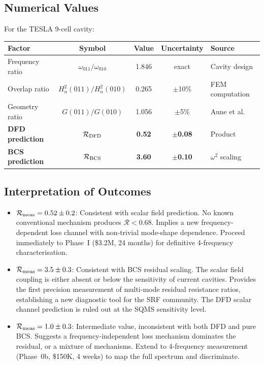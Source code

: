 \documentclass[11pt]{article}
\newcommand{\Rq}{\mathcal{R}}
\newcommand{\Heff}{H_n}
\begin{document}
\subsection{Numerical Values}

For the TESLA 9-cell cavity:

\begin{center}
\renewcommand{\arraystretch}{1.3}
\begin{tabular}{@{}lcccl@{}}
\toprule
\textbf{Factor} & \textbf{Symbol} & \textbf{Value} & \textbf{Uncertainty}
& \textbf{Source} \\
\midrule
Frequency ratio & $\omega_{011}/\omega_{010}$ & 1.846 & exact & Cavity
design \\
Overlap ratio & $\Heff^2(011)/\Heff^2(010)$ & 0.265 & $\pm$10\% & FEM
computation \\
Geometry ratio & $G(011)/G(010)$ & 1.056 & $\pm$5\% & Aune et al. \\
\midrule
\textbf{DFD prediction} & $\Rq_{\rm DFD}$ & \textbf{0.52} &
$\pm$\textbf{0.08} & Product \\
\textbf{BCS prediction} & $\Rq_{\rm BCS}$ & \textbf{3.60} &
$\pm$\textbf{0.10} & $\omega^2$ scaling \\
\bottomrule
\end{tabular}
\end{center}

\subsection{Interpretation of Outcomes}

\begin{itemize}
\item \textbf{$\Rq_{\rm meas} = 0.52 \pm 0.2$}: Consistent with scalar
  field prediction. No known conventional mechanism produces $\Rq < 0.68$.
  Implies a new frequency-dependent loss channel with non-trivial mode-shape
  dependence. Proceed immediately to Phase~I (\$3.2M, 24 months) for
  definitive 4-frequency characterisation.

\item \textbf{$\Rq_{\rm meas} = 3.5 \pm 0.3$}: Consistent with BCS
  residual scaling. The scalar field coupling is either absent or below
  the sensitivity of current cavities. Provides the first precision
  measurement of multi-mode residual resistance ratios, establishing
  a new diagnostic tool for the SRF community. The DFD scalar channel
  prediction is ruled out at the SQMS sensitivity level.

\item \textbf{$\Rq_{\rm meas} = 1.0 \pm 0.3$}: Intermediate value,
  inconsistent with both DFD and pure BCS. Suggests a
  frequency-independent loss mechanism dominates the residual, or a
  mixture of mechanisms. Extend to 4-frequency measurement (Phase~0b,
  \$150K, 4 weeks) to map the full spectrum and discriminate.
\end{itemize}
\end{document}
